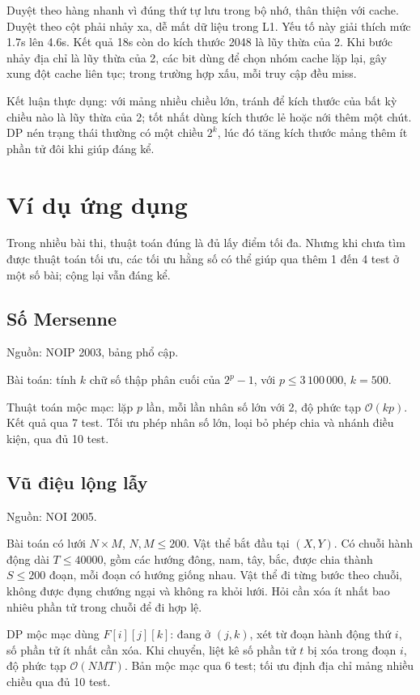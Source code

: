 \documentclass[11pt]{article}
\newcommand{\Oh}{\mathcal{O}}
\begin{document}
Duyệt theo hàng nhanh vì đúng thứ tự lưu trong bộ nhớ, thân thiện với cache.
Duyệt theo cột phải nhảy xa, dễ mất dữ liệu trong L1. Yếu tố này giải thích
mức 1.7s lên 4.6s. Kết quả 18s còn do kích thước 2048 là lũy thừa của 2. Khi
bước nhảy địa chỉ là lũy thừa của 2, các bit dùng để chọn nhóm cache lặp lại,
gây xung đột cache liên tục; trong trường hợp xấu, mỗi truy cập đều miss.

Kết luận thực dụng: với mảng nhiều chiều lớn, tránh để kích thước của bất kỳ
chiều nào là lũy thừa của 2; tốt nhất dùng kích thước lẻ hoặc nới thêm một
chút. DP nén trạng thái thường có một chiều \(2^k\), lúc đó tăng kích thước
mảng thêm ít phần tử đôi khi giúp đáng kể.

\section{Ví dụ ứng dụng}

Trong nhiều bài thi, thuật toán đúng là đủ lấy điểm tối đa. Nhưng khi chưa
tìm được thuật toán tối ưu, các tối ưu hằng số có thể giúp qua thêm 1 đến 4
test ở một số bài; cộng lại vẫn đáng kể.

\subsection{Số Mersenne}

Nguồn: NOIP 2003, bảng phổ cập.

Bài toán: tính \(k\) chữ số thập phân cuối của \(2^p-1\), với
\(p\le 3\,100\,000\), \(k=500\).

Thuật toán mộc mạc: lặp \(p\) lần, mỗi lần nhân số lớn với 2, độ phức tạp
\(\Oh(kp)\). Kết quả qua 7 test. Tối ưu phép nhân số lớn, loại bỏ phép chia
và nhánh điều kiện, qua đủ 10 test.

\subsection{Vũ điệu lộng lẫy}

Nguồn: NOI 2005.

Bài toán có lưới \(N\times M\), \(N,M\le 200\). Vật thể bắt đầu tại
\((X,Y)\). Có chuỗi hành động dài \(T\le 40000\), gồm các hướng đông, nam,
tây, bắc, được chia thành \(S\le 200\) đoạn, mỗi đoạn có hướng giống nhau.
Vật thể đi từng bước theo chuỗi, không được đụng chướng ngại và không ra khỏi
lưới. Hỏi cần xóa ít nhất bao nhiêu phần tử trong chuỗi để đi hợp lệ.

DP mộc mạc dùng \(F[i][j][k]\): đang ở \((j,k)\), xét từ đoạn hành động thứ
\(i\), số phần tử ít nhất cần xóa. Khi chuyển, liệt kê số phần tử \(t\) bị xóa
trong đoạn \(i\), độ phức tạp \(\Oh(NMT)\). Bản mộc mạc qua 6 test; tối ưu
định địa chỉ mảng nhiều chiều qua đủ 10 test.
\end{document}

